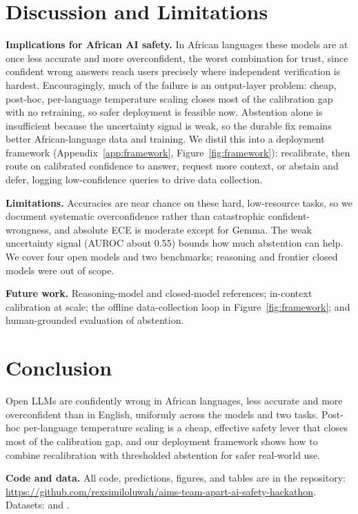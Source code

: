 \documentclass[11pt]{article}
\begin{document}
\section{Discussion and Limitations}
\textbf{Implications for African AI safety.} In African languages these models are at once less
accurate and more overconfident, the worst combination for trust, since confident wrong answers
reach users precisely where independent verification is hardest. Encouragingly, much of the failure
is an output-layer problem: cheap, post-hoc, per-language temperature scaling closes most of the
calibration gap with no retraining, so safer deployment is feasible now. Abstention alone is
insufficient because the uncertainty signal is weak, so the durable fix remains better
African-language data and training. We distil this into a deployment framework
(Appendix~\ref{app:framework}, Figure~\ref{fig:framework}): recalibrate, then route on calibrated
confidence to answer, request more context, or abstain and defer, logging low-confidence queries to
drive data collection.

\textbf{Limitations.} Accuracies are near chance on these hard, low-resource tasks, so we document
systematic overconfidence rather than catastrophic confident-wrongness, and absolute ECE is moderate
except for Gemma. The weak uncertainty signal (AUROC about 0.55) bounds how much abstention can help.
We cover four open models and two benchmarks; reasoning and frontier closed models were out of scope.

\textbf{Future work.} Reasoning-model and closed-model references; in-context calibration at scale;
the offline data-collection loop in Figure~\ref{fig:framework}; and human-grounded evaluation of
abstention.

\section{Conclusion}
Open LLMs are confidently wrong in African languages, less accurate and more overconfident than in
English, uniformly across the models and two tasks. Post-hoc per-language temperature scaling is a
cheap, effective safety lever that closes most of the calibration gap, and our deployment framework
shows how to combine recalibration with thresholded abstention for safer real-world use.

\noindent\textbf{Code and data.} All code, predictions, figures, and tables are in the repository:
\url{https://github.com/rexsimiloluwah/aims-team-apart-ai-safety-hackathon}. Datasets:
 and .
\end{document}
